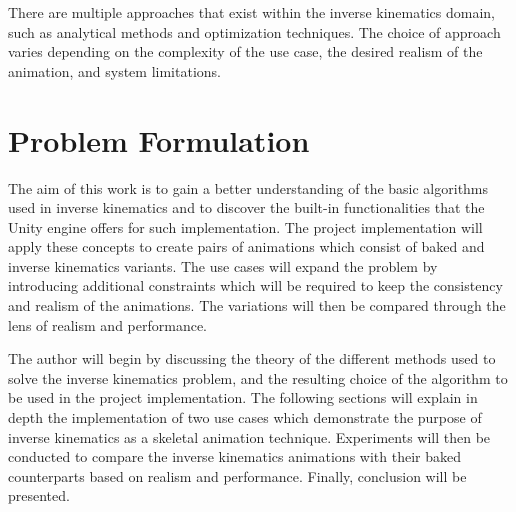 There are multiple approaches that exist within the inverse kinematics domain,
such as analytical methods and optimization techniques. The choice of approach
varies depending on the complexity of the use case, the desired realism of the
animation, and system limitations.

\section{Problem Formulation}

The aim of this work is to gain a better understanding of the basic algorithms
used in inverse kinematics and to discover the built-in functionalities that the
Unity engine offers for such implementation. The project implementation will
apply these concepts to create pairs of animations which consist of baked and
inverse kinematics variants. The use cases will expand the problem by
introducing additional constraints which will be required to keep the
consistency and realism of the animations. The variations will then be compared
through the lens of realism and performance.

The author will begin by discussing the theory of the different methods used to
solve the inverse kinematics problem, and the resulting choice of the algorithm
to be used in the project implementation. The following sections will explain in
depth the implementation of two use cases which demonstrate the purpose of
inverse kinematics as a skeletal animation technique. Experiments will then be
conducted to compare the inverse kinematics animations with their baked
counterparts based on realism and performance. Finally, conclusion will be
presented.
